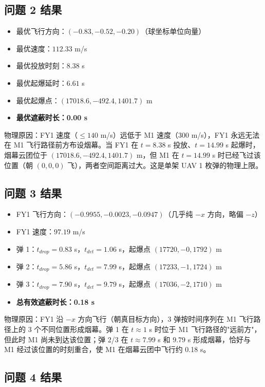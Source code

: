 \subsection{问题 2 结果}

\begin{itemize}
  \item 最优飞行方向：$(-0.83, -0.52, -0.20)$（球坐标单位向量）
  \item 最优速度：$112.33$ m/s
  \item 最优投放时刻：$8.38$ s
  \item 最优起爆延时：$6.61$ s
  \item 最优起爆点：$(17018.6, -492.4, 1401.7)$ m
  \item \textbf{最优遮蔽时长：0.00 s}
\end{itemize}

物理原因：FY1 速度（$\le 140$ m/s）远低于 M1 速度（$300$ m/s），FY1 永远无法在 M1 飞行路径前方布设烟幕。当 FY1 在 $t=8.38$ s 投放、$t=14.99$ s 起爆时，烟幕云团位于 $(17018.6, -492.4, 1401.7)$ m，但 M1 在 $t=14.99$ s 时已经飞过该位置（朝 $(0,0,0)$ 飞），两者空间距离过大。这是单架 UAV 1 枚弹的物理上限。

\subsection{问题 3 结果}

\begin{itemize}
  \item FY1 飞行方向：$(-0.9955, -0.0023, -0.0947)$（几乎纯 $-x$ 方向，略偏 $-z$）
  \item FY1 速度：$97.19$ m/s
  \item 弹 1：$t_{drop}=0.83$ s，$t_{det}=1.06$ s，起爆点 $(17720, -0, 1792)$ m
  \item 弹 2：$t_{drop}=5.86$ s，$t_{det}=7.99$ s，起爆点 $(17233, -1, 1724)$ m
  \item 弹 3：$t_{drop}=7.90$ s，$t_{det}=9.79$ s，起爆点 $(17036, -2, 1710)$ m
  \item \textbf{总有效遮蔽时长：0.18 s}
\end{itemize}

物理原因：FY1 沿 $-x$ 方向飞行（朝真目标方向），3 弹按时间序列在 M1 飞行路径上的 3 个不同位置形成烟幕。弹 1 在 $t \approx 1$ s 时位于 M1 飞行路径的"远前方"，但此时 M1 尚未到达该位置；弹 2/3 在 $t \approx 7.99$ s 和 $9.79$ s 形成烟幕，恰好与 M1 经过该位置的时刻重合，使 M1 在烟幕云团中飞行约 0.18 s。

\subsection{问题 4 结果}


